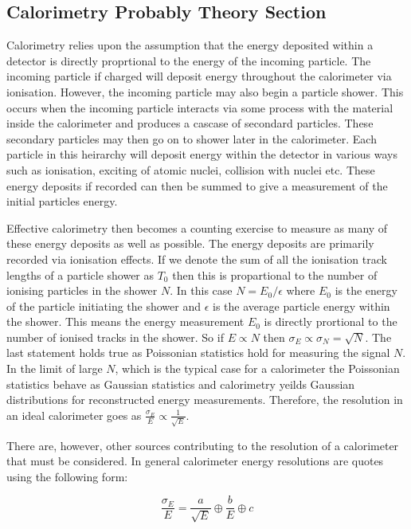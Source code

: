 \subsection{Calorimetry Probably Theory Section}
Calorimetry relies upon the assumption that the energy deposited within a detector is directly proprtional to the energy of the incoming particle.  The incoming particle if charged will deposit energy throughout the calorimeter via ionisation.  However, the incoming particle may also begin a particle shower.  This occurs when the incoming particle interacts via some process with the material inside the calorimeter and produces a cascase of secondard particles.  These secondary particles may then go on to shower later in the calorimeter.  Each particle in this heirarchy will deposit energy within the detector in various ways such as ionisation, exciting of atomic nuclei, collision with nuclei etc.  These energy deposits if recorded can then be summed to give a measurement of the initial particles energy.

Effective calorimetry then becomes a counting exercise to measure as many of these energy deposits as well as possible.  The energy deposits are primarily recorded via ionisation effects.  If we denote the sum of all the ionisation track lengths of a particle shower as $T_{0}$ then this is propartional to the number of ionising particles in the shower $N$.  In this case $N = E_{0}/\epsilon$ where $E_{0}$ is the energy of the particle initiating the shower and $\epsilon$ is the average particle energy within the shower.  This means the energy measurement $E_{0}$ is directly prortional to the number of ionised tracks in the shower.  So if $E \propto N$ then $\sigma_{E} \propto \sigma_{N} = \sqrt{N}$.  The last statement holds true as Poissonian statistics hold for measuring the signal $N$.  In the limit of large $N$, which is the typical case for a calorimeter the Poissonian statistics behave as Gaussian statistics and calorimetry yeilds Gaussian distributions for reconstructed energy measurements.  Therefore, the resolution in an ideal calorimeter goes as $\frac{\sigma_{E}}{E} \propto \frac{1}{\sqrt{E}}$.

There are, however, other sources contributing to the resolution of a calorimeter that must be considered.  In general calorimeter energy resolutions are quotes using the following form:

\begin{equation}
\frac{\sigma_{E}}{E} = \frac{a}{\sqrt{E}} \oplus \frac{b}{E} \oplus c
\end{equation}


